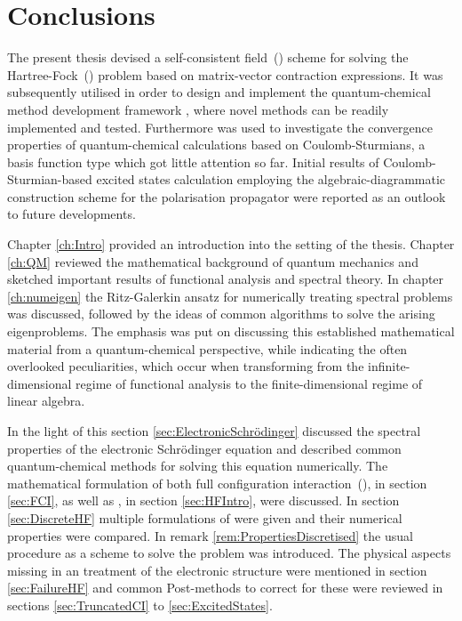 \chapter{Conclusions}
\label{ch:Conclusion}

\noindent
The present thesis devised a self-consistent field~(\SCF)
scheme for solving the Hartree-Fock~(\HF) problem
based on matrix-vector contraction expressions.
It was subsequently utilised in order to design and implement the
quantum-chemical method development framework \molsturm,
where novel methods can be readily implemented and tested.
Furthermore \molsturm was used to investigate the convergence properties
of quantum-chemical calculations
based on Coulomb-Sturmians,
a basis function type which got little attention so far.
Initial results of Coulomb-Sturmian-based excited states
calculation employing the algebraic-diagrammatic construction scheme
for the polarisation propagator were reported
as an outlook to future developments.


Chapter \ref{ch:Intro} provided an introduction into the setting
of the thesis.
Chapter \ref{ch:QM}
reviewed the mathematical background of quantum mechanics
and sketched important results of functional analysis
and spectral theory.
In chapter \ref{ch:numeigen} the Ritz-Galerkin ansatz
for numerically treating spectral problems
was discussed, followed by the ideas of common algorithms
to solve the arising eigenproblems.
The emphasis
was put on discussing this established mathematical
material from a quantum-chemical perspective,
while indicating the often overlooked peculiarities,
which occur when transforming from the infinite-dimensional regime
of functional analysis to the finite-dimensional regime of linear algebra.


In the light of this section \ref{sec:ElectronicSchrödinger}
discussed the spectral properties
of the electronic Schrödinger equation and
described common quantum-chemical methods
for solving this equation numerically.
The mathematical formulation of both full configuration interaction~(\FCI),
in section \ref{sec:FCI},
as well as \HF, in section \ref{sec:HFIntro}, were discussed.
In section \ref{sec:DiscreteHF} multiple formulations of \HF were given
and their numerical properties were compared.
In remark \ref{rem:PropertiesDiscretised}
the usual \SCF procedure
as a scheme to solve the \HF problem was introduced.
The physical aspects missing in an \HF treatment of the electronic
structure were mentioned in section \ref{sec:FailureHF}
and common Post-\HF methods to correct for these were
reviewed in sections \ref{sec:TruncatedCI} to \ref{sec:ExcitedStates}.

